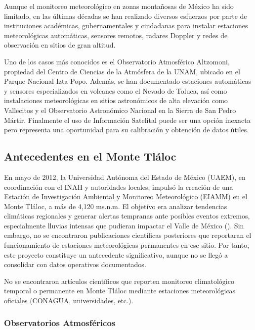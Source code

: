 Aunque el monitoreo meteorológico en zonas montañosas de México ha sido limitado, en las últimas décadas se han realizado diversos esfuerzos por parte de instituciones académicas, gubernamentales y ciudadanas para instalar estaciones meteorológicas automáticas, sensores remotos, radares Doppler y redes de observación en sitios de gran altitud.

Uno de los casos más conocidos es el Observatorio Atmosférico Altzomoni, propiedad del Centro de Ciencias de la Atmósfera de la UNAM, ubicado en el Parque Nacional Izta-Popo. Además, se han documentado estaciones automáticas y sensores especializados en volcanes como el Nevado de Toluca, así como instalaciones meteorológicas en sitios astronómicos de alta elevación como Vallecitos y el Observatorio Astronómico Nacional en la Sierra de San Pedro Mártir. Finalmente el uso de Información Satelital puede ser una opción inexacta pero representa una oportunidad para su calibración y obtención de datos útiles.



\subsection{Antecedentes en el Monte Tláloc}

En mayo de 2012, la Universidad Autónoma del Estado de México (UAEM), en coordinación con el INAH y autoridades locales, impulsó la creación de una Estación de Investigación Ambiental y Monitoreo Meteorológico (EIAMM) en el Monte Tláloc, a más de 4,120  ms.n.m. El objetivo era analizar tendencias climáticas regionales y generar alertas tempranas ante posibles eventos extremos, especialmente lluvias intensas que pudieran impactar el Valle de México (\cite{davila2012}). Sin embargo, no se encontraron publicaciones científicas posteriores que reportaran el funcionamiento de estaciones meteorológicas permanentes en ese sitio. Por tanto, este proyecto constituye un antecedente significativo, aunque no se llegó a consolidar con datos operativos documentados.

No se encontraron artículos científicos que reporten monitoreo climatológico temporal o permanente en Monte Tláloc mediante estaciones meteorológicas oficiales (CONAGUA, universidades, etc.).

\subsubsection*{Observatorios Atmosféricos}

